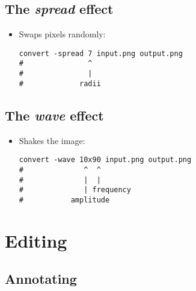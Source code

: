 
\section{The \emph{spread} effect}

\begin{itemize}
\item Swaps pixels randomly:
\begin{lstlisting}
convert -spread 7 input.png output.png
#               ^
#               |
#             radii
\end{lstlisting}
\end{itemize}


\section{The \emph{wave} effect}

\begin{itemize}
\item Shakes the image:
\begin{lstlisting}
convert -wave 10x90 input.png output.png
#              ^  ^
#              |  | 
#              | frequency
#           amplitude
\end{lstlisting}
\end{itemize}




\chapter{Editing}

\section{Annotating}

